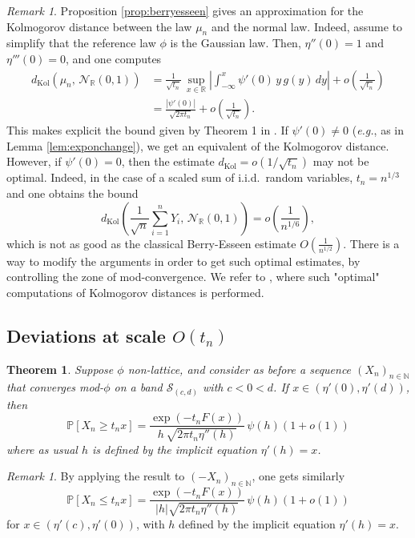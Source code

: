 \documentclass[12pt,a4paper,reqno]{amsart}
\newtheorem{theorem}[lemma]{Theorem}
\theoremstyle{remark}
\newtheorem{remark}[lemma]{Remark}
\newcommand{\N}{\mathbb{N}}
\newcommand{\R}{\mathbb{R}}
\newcommand{\proba}{\mathbb{P}}
\begin{document}
\begin{remark}
Proposition \ref{prop:berryesseen} gives an approximation for the Kolmogorov distance between the law $\mu_n$ and the normal law. Indeed, assume to simplify that the reference law $\phi$ is the Gaussian law. Then, $\eta''(0)=1$ and $\eta'''(0)=0$, and one computes
\begin{align*}
d_\text{Kol}(\mu_n,\,\mathcal{N}_{\R}(0,1))&=\frac{1}{\sqrt{t_n}}\,\sup_{x \in \R} \left|\int_{-\infty}^x\psi'(0)\,y\,g(y)\,dy\right|+o\!\left(\frac{1}{\sqrt{t_n}}\right) \\
&= \frac{|\psi'(0)|}{\sqrt{2\pi t_n}}+o\!\left(\frac{1}{\sqrt{t_n}}\right).
\end{align*}
This makes explicit the bound given by Theorem 1 in \cite{Hwa98}.
If $\psi'(0) \ne 0$ ({\em e.g.}, as in Lemma \ref{lem:exponchange}), we get an equivalent of the Kolmogorov distance. However, if $\psi'(0)=0$, then the estimate $d_{\mathrm{Kol}}=o(1/\sqrt{t_n})$ may not be optimal. Indeed, in the case of a scaled sum of i.i.d.~random variables, $t_n=n^{1/3}$ and one obtains the bound 
$$d_{\mathrm{Kol}}\left(\frac{1}{\sqrt{n}}\sum_{i=1}^n Y_i,\,\mathcal{N}_{\R}(0,1)\right)=o\!\left(\frac{1}{n^{1/6}}\right),$$
which is not as good as the classical Berry-Esseen estimate $O(\frac{1}{n^{1/2}})$. There is a way to modify the arguments in order to get such optimal estimates, by controlling  the zone of mod-convergence. We refer to \cite{FMN14}, where such "optimal" computations of Kolmogorov distances is performed.
\end{remark}
\bigskip



\subsection{Deviations at scale \texorpdfstring{$O(t_{n})$}{O(tn)}} 
\begin{theorem}\label{thm:mainnonlattice}
Suppose $\phi$ non-lattice, and consider as before a sequence $(X_n)_{n \in \N}$ that converges mod-$\phi$ on a band $\mathcal{S}_{(c,d)}$ with $c < 0 <d$. If $x \in (\eta'(0),\eta'(d))$, then 
$$\proba[X_{n}\geq t_{n}x]=\frac{\exp(-t_{n}F(x))}{h\,\sqrt{2\pi t_{n}\eta''(h)}}\,\psi(h)\left(1+o(1)\right)$$
where as usual $h$ is defined by the implicit equation $\eta'(h)=x$.
\end{theorem}\medskip

\begin{remark}
By applying the result to $(-X_n)_{n \in \N}$, one gets similarly
$$\proba[X_n \leq t_nx] = \frac{\exp(-t_n F(x))}{|h|\sqrt{2\pi t_n \eta''(h)}}\, \psi(h)\left(1+o(1)\right)$$
for $x \in (\eta'(c),\eta'(0))$, with $h$ defined by the implicit equation $\eta'(h)=x$.
\label{rmq:neg_dev}
\end{remark}
\end{document}
